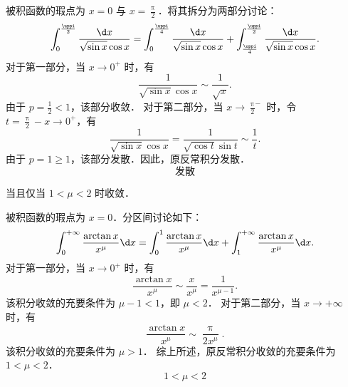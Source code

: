 \begin{solution}
    被积函数的瑕点为 $x = 0$ 与 $x = \frac{\uppi}{2}$．将其拆分为两部分讨论：
    \begin{equation}
        \int_0^{\frac{\uppi}{2}} \frac{\d x}{\sqrt{\sin x} \cos x} = \int_0^{\frac{\uppi}{4}} \frac{\d x}{\sqrt{\sin x} \cos x} + \int_{\frac{\uppi}{4}}^{\frac{\uppi}{2}} \frac{\d x}{\sqrt{\sin x} \cos x}.
    \end{equation}
    对于第一部分，当 $x \to 0^+$ 时，有
    \begin{equation}
        \frac{1}{\sqrt{\sin x} \cos x} \sim \frac{1}{\sqrt{x}}.
    \end{equation}
    由于 $p = \frac{1}{2} < 1$，该部分收敛．
    对于第二部分，当 $x \to \frac{\uppi}{2}^-$ 时，令 $t = \frac{\uppi}{2} - x \to 0^+$，有
    \begin{equation}
        \frac{1}{\sqrt{\sin x} \cos x} = \frac{1}{\sqrt{\cos t} \sin t} \sim \frac{1}{t}.
    \end{equation}
    由于 $p = 1 \geqslant 1$，该部分发散．因此，原反常积分发散．
    \begin{equation}
        \boxed{\text{发散}}
    \end{equation}

     当且仅当 $1 < \mu < 2$ 时收敛．

    被积函数的瑕点为 $x = 0$．分区间讨论如下：
    \begin{equation}
        \int_0^{+\infty} \frac{\arctan x}{x^{\mu}} \d x = \int_0^1 \frac{\arctan x}{x^{\mu}} \d x + \int_1^{+\infty} \frac{\arctan x}{x^{\mu}} \d x.
    \end{equation}
    对于第一部分，当 $x \to 0^+$ 时，有
    \begin{equation}
        \frac{\arctan x}{x^{\mu}} \sim \frac{x}{x^{\mu}} = \frac{1}{x^{\mu - 1}}.
    \end{equation}
    该积分收敛的充要条件为 $\mu - 1 < 1$，即 $\mu < 2$．
    对于第二部分，当 $x \to +\infty$ 时，有
    \begin{equation}
        \frac{\arctan x}{x^{\mu}} \sim \frac{\uppi}{2 x^{\mu}}.
    \end{equation}
    该积分收敛的充要条件为 $\mu > 1$．
    综上所述，原反常积分收敛的充要条件为 $1 < \mu < 2$．
    \begin{equation}
        \boxed{1 < \mu < 2}
    \end{equation}
\end{solution}

